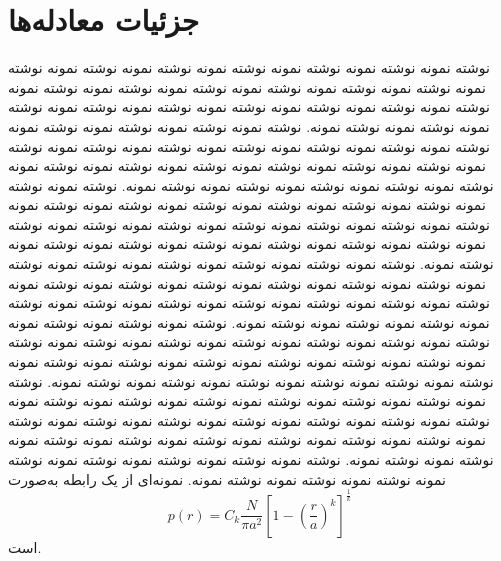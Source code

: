 \section{جزئیات معادله‌ها}
نوشته نمونه نوشته نمونه نوشته نمونه نوشته نمونه نوشته نمونه نوشته نمونه نوشته نمونه نوشته نمونه نوشته نمونه نوشته نمونه نوشته نمونه نوشته نمونه نوشته نمونه نوشته نمونه نوشته نمونه نوشته نمونه نوشته نمونه نوشته نمونه نوشته نمونه نوشته نمونه نوشته نمونه نوشته نمونه. نوشته نمونه نوشته نمونه نوشته نمونه نوشته نمونه نوشته نمونه نوشته نمونه نوشته نمونه نوشته نمونه نوشته نمونه نوشته نمونه نوشته نمونه نوشته نمونه نوشته نمونه نوشته نمونه نوشته نمونه نوشته نمونه نوشته نمونه نوشته نمونه نوشته نمونه نوشته نمونه نوشته نمونه نوشته نمونه. نوشته نمونه نوشته نمونه نوشته نمونه نوشته نمونه نوشته نمونه نوشته نمونه نوشته نمونه نوشته نمونه نوشته نمونه نوشته نمونه نوشته نمونه نوشته نمونه نوشته نمونه نوشته نمونه نوشته نمونه نوشته نمونه نوشته نمونه نوشته نمونه نوشته نمونه نوشته نمونه نوشته نمونه نوشته نمونه. نوشته نمونه نوشته نمونه نوشته نمونه نوشته نمونه نوشته نمونه نوشته نمونه نوشته نمونه نوشته نمونه نوشته نمونه نوشته نمونه نوشته نمونه نوشته نمونه نوشته نمونه نوشته نمونه نوشته نمونه نوشته نمونه نوشته نمونه نوشته نمونه نوشته نمونه نوشته نمونه نوشته نمونه نوشته نمونه. نوشته نمونه نوشته نمونه نوشته نمونه نوشته نمونه نوشته نمونه نوشته نمونه نوشته نمونه نوشته نمونه نوشته نمونه نوشته نمونه نوشته نمونه نوشته نمونه نوشته نمونه نوشته نمونه نوشته نمونه نوشته نمونه نوشته نمونه نوشته نمونه نوشته نمونه نوشته نمونه نوشته نمونه نوشته نمونه. نوشته نمونه نوشته نمونه نوشته نمونه نوشته نمونه نوشته نمونه نوشته نمونه نوشته نمونه نوشته نمونه نوشته نمونه نوشته نمونه نوشته نمونه نوشته نمونه نوشته نمونه نوشته نمونه نوشته نمونه نوشته نمونه نوشته نمونه نوشته نمونه نوشته نمونه نوشته نمونه نوشته نمونه نوشته نمونه. نوشته نمونه نوشته نمونه نوشته نمونه نوشته نمونه نوشته نمونه نوشته نمونه نوشته نمونه نوشته نمونه. نمونه‌ای از یک رابطه به‌صورت
\begin{equation}
p\left( r \right) = {C_k}\frac{N}{{\pi {a^2}}}{\left[{1 - {{\left( {\frac{r}{a}} \right)}^k}} \right]^{\frac{1}{k}}}
\label{Eq:Pressure1}
\end{equation}
است.

\newpage
